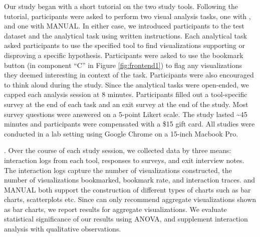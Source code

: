 Our study began with a short tutorial on the two study tools.
Following the tutorial, participants were asked to perform two visual analysis 
tasks, one with \SeeDB, and one with MANUAL.
In either case, we introduced participants to the test dataset
and the analytical task using written instructions.
Each analytical task asked participants to use the specified tool to find 
visualizations supporting or disproving a specific hypothesis.
Participants were asked to use the bookmark button (in component ``C'' in Figure 
\ref{fig:frontend1}) to flag any visualizations they deemed interesting in
context of the task.
Participants were also encouraged to think aloud during the study.
Since the analytical tasks were open-ended, we capped each analysis session at 8 minutes.
Participants filled out a tool-specific survey at the end of each task and
an exit survey at the end of the study.
Most survey questions were answered on a 5-point Likert scale.
The study lasted \textasciitilde 45 minutes and participants were compensated 
 with a \$15 gift card.
All studies were conducted in a lab setting using Google Chrome on a 15-inch 
Macbook Pro.

.
Over the course of each study session, we collected data by three means: interaction logs 
from each tool, responses to surveys, and exit interview notes.
The interaction logs capture the number of visualizations
constructed, the number of visualizations bookmarked, bookmark rate, and interaction traces.
\SeeDB and MANUAL both support the construction of different types of charts such as bar 
charts, scatterplots etc.
Since \SeeDB can only recommend aggregate visualizations shown as bar charts,
we report results for aggregate visualizations.
We evaluate statistical significance of our results using ANOVA,
and supplement interaction analysis with qualitative observations.



